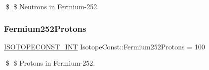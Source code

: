 \$ \$ Neutrons in Fermium-\/252. \mbox{\label{group___isotope_const-_fermium-_fm252_ga8841f4b7d6948df80e78d44cb6895583}} 
\subsubsection{\texorpdfstring{Fermium252\+Protons}{Fermium252Protons}}
{\footnotesize\ttfamily \mbox{\hyperlink{group___isotope_const-_macros_ga5f18360b3e99483a35c32d789e62621c}{I\+S\+O\+T\+O\+P\+E\+C\+O\+N\+S\+T\+\_\+\+I\+NT}} Isotope\+Const\+::\+Fermium252\+Protons = 100}

\$ \$ Protons in Fermium-\/252. 